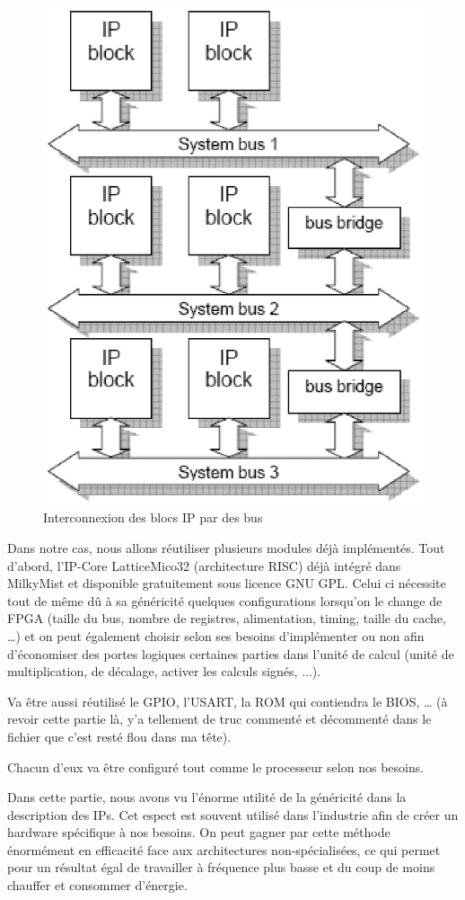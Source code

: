 \begin{figure}
\begin{center}
\includegraphics[scale=0.4]{soc_interconnect.eps}
\end{center}
\caption{Interconnexion des blocs IP par des bus}
\end{figure}

Dans notre cas, nous allons réutiliser plusieurs modules déjà implémentés. Tout d'abord, l'IP-Core LatticeMico32 (architecture RISC) déjà intégré dans MilkyMist et disponible gratuitement sous licence GNU GPL. Celui ci nécessite tout de même dû à sa généricité quelques configurations lorsqu'on le change de FPGA (taille du bus, nombre de registres, alimentation, timing, taille du cache, …) et on peut également choisir selon ses besoins d'implémenter ou non afin d'économiser des portes logiques certaines parties dans l'unité de calcul (unité de multiplication, de décalage, activer les calculs signés, ...).
\medskip

Va être aussi réutilisé le GPIO, l'USART, la ROM qui contiendra le BIOS, … (à revoir cette partie là, y'a tellement de truc commenté et décommenté dans le fichier que c'est resté flou dans ma tête).
\medskip

Chacun d'eux va être configuré tout comme le processeur selon nos besoins.
\medskip

Dans cette partie, nous avons vu l'énorme utilité de la généricité dans la description des IPs. Cet espect est souvent utilisé dans l'industrie afin de créer un hardware spécifique à nos besoins. On peut gagner par cette méthode énormément en efficacité face aux architectures non-spécialisées, ce qui permet pour un résultat égal de travailler à fréquence plus basse et du coup de moins chauffer et consommer d'énergie.
\medskip
